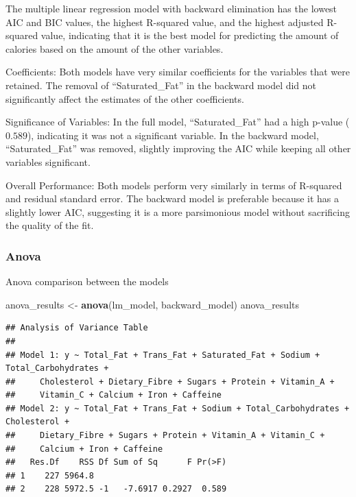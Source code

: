 \documentclass[
]{article}
\newenvironment{Shaded}{\begin{snugshade}}{\end{snugshade}}
\newcommand{\FunctionTok}[1]{\textcolor[rgb]{0.13,0.29,0.53}{\textbf{#1}}}
\newcommand{\NormalTok}[1]{#1}
\newcommand{\OtherTok}[1]{\textcolor[rgb]{0.56,0.35,0.01}{#1}}
\begin{document}
The multiple linear regression model with backward elimination has the
lowest AIC and BIC values, the highest R-squared value, and the highest
adjusted R-squared value, indicating that it is the best model for
predicting the amount of calories based on the amount of the other
variables.

Coefficients: Both models have very similar coefficients for the
variables that were retained. The removal of ``Saturated\_Fat'' in the
backward model did not significantly affect the estimates of the other
coefficients.

Significance of Variables: In the full model, ``Saturated\_Fat'' had a
high p-value (\(0.589\)), indicating it was not a significant variable.
In the backward model, ``Saturated\_Fat'' was removed, slightly
improving the AIC while keeping all other variables significant.

Overall Performance: Both models perform very similarly in terms of
R-squared and residual standard error. The backward model is preferable
because it has a slightly lower AIC, suggesting it is a more
parsimonious model without sacrificing the quality of the fit.

\hypertarget{anova}{%
\subsubsection{Anova}\label{anova}}

Anova comparison between the models

\begin{Shaded}
\begin{Highlighting}[]
\NormalTok{anova\_results }\OtherTok{\textless{}{-}} \FunctionTok{anova}\NormalTok{(lm\_model, backward\_model)}
\NormalTok{anova\_results}
\end{Highlighting}
\end{Shaded}

\begin{verbatim}
## Analysis of Variance Table
## 
## Model 1: y ~ Total_Fat + Trans_Fat + Saturated_Fat + Sodium + Total_Carbohydrates + 
##     Cholesterol + Dietary_Fibre + Sugars + Protein + Vitamin_A + 
##     Vitamin_C + Calcium + Iron + Caffeine
## Model 2: y ~ Total_Fat + Trans_Fat + Sodium + Total_Carbohydrates + Cholesterol + 
##     Dietary_Fibre + Sugars + Protein + Vitamin_A + Vitamin_C + 
##     Calcium + Iron + Caffeine
##   Res.Df    RSS Df Sum of Sq      F Pr(>F)
## 1    227 5964.8                           
## 2    228 5972.5 -1   -7.6917 0.2927  0.589
\end{verbatim}
\end{document}
